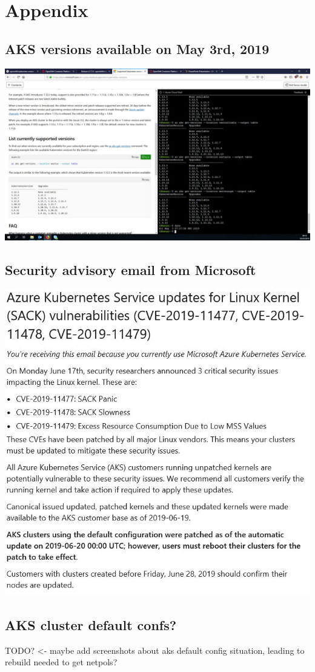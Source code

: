 
\appendix
\doublespacing
\chapter{Appendix}

\section{AKS versions available on May 3rd, 2019}

\includegraphics[scale=0.75]{pictures/aksVersionsMay.jpg}\label{aksVersionsMay}


\section{Security advisory email from Microsoft}

\includegraphics[scale=0.8]{pictures/securityMailMS.jpg}\label{securityMailMS}

\section{AKS cluster default confs?}
TODO? <- maybe add screenshots about aks default config situation, leading to rebuild needed to get netpols?
